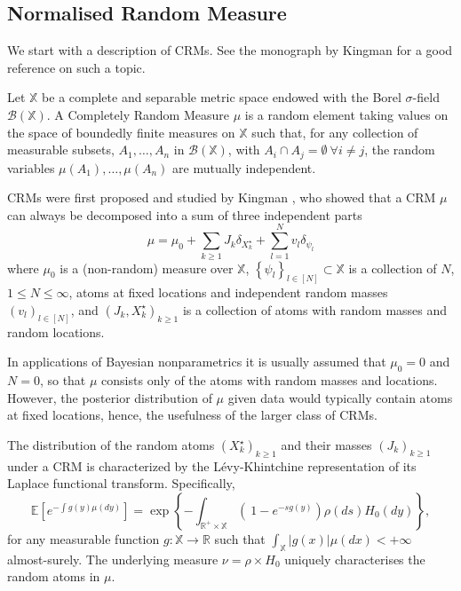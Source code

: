 \subsection{Normalised Random Measure}
We start with a description of \glspl{CRM}.
See the monograph by Kingman \cite{kingman-poisson-processes} for a good reference on such a topic. \\

\begin{definition} \label{def:CRM}
Let $\mathbb{X}$ be a complete and separable metric space endowed with the Borel $\sigma$-field $\mathcal{B}(\mathbb{X})$. A Completely Random Measure $\mu$ is a random element taking values on the space of boundedly finite measures on $\mathbb{X}$ such that, for any collection of measurable subsets, $A_1, \dots , A_n$ in $\mathcal{B}(\mathbb{X})$, with $A_i \cap  A_j = \emptyset \ \forall i \neq j$, the random variables $\mu(A_1), \dots, \mu(A_n)$ are mutually independent.
\end{definition}

\glspl{CRM} were first proposed and studied by Kingman \cite{Kingman:1967kn}, who showed that a \gls{CRM} $\mu$ can always be decomposed into a sum of three independent parts
$$ \mu = \mu_0 + \sum_{k \ge 1}{J_k \delta_{X^\star_k}} + \sum_{l=1}^N{v_l \delta_{\psi_l}} $$
where $\mu_0$ is a (non-random) measure over $\mathbb{X}$, $\left\{ \psi_l \right\}_{l \in [N]} \subset  \mathbb{X}$ is a collection of $N$, $1 \le N \le \infty$, atoms at fixed locations and independent random masses $\left(v_l \right)_{l \in [N]}$, and $\left(J_k, X^\star_k \right)_{k \ge 1}$ is a collection of atoms with random masses and random locations.

In applications of Bayesian nonparametrics it is usually assumed that $\mu_0 = 0$ and $N = 0$, so that $\mu$ consists only of the atoms with random masses and locations. However, the posterior distribution of $\mu$ given data would typically contain atoms at fixed locations, hence, the usefulness of the larger class of \glspl{CRM}.

The distribution of the random atoms $\left(X^\star_k \right)_{k \ge 1}$ and their masses $\left(J_k \right)_{k \ge 1}$ under a \gls{CRM} is characterized by the Lévy-Khintchine representation of its Laplace functional transform. Specifically,
\begin{equation} \label{eq:levy}
\mathbb{E} \left[e^{-\int g(y)\mu(dy)} \right] = \exp \left\{ - \int_{\mathbb{R}^+ \times \mathbb{X}} \left( \  1 - e^{-sg(y)} \right) \rho(ds) H_0(dy) \right\},
\end{equation}
for any measurable function $g: \mathbb{X} \rightarrow \mathbb{R}$ such that $\int_{\mathbb{X}}|g(x)|\mu(dx)<+ \infty$ almost-surely.
The underlying measure $\nu = \rho \times H_0$ uniquely characterises the random atoms in $\mu$.

